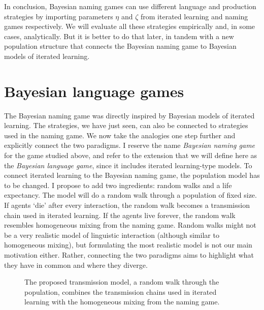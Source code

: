 \documentclass{../src/bcthesispart}
\begin{document}
In conclusion, Bayesian naming games can use different language and production strategies by importing parameters $\eta$ and $\zeta$ from iterated learning and naming games respectively.
We will evaluate all these strategies empirically and, in some cases, analytically.
But it is better to do that later, in tandem with a new population structure that connects the Bayesian naming game to Bayesian models of iterated learning.







\section{Bayesian language games}


The Bayesian naming game was directly inspired by Bayesian models of iterated learning.
The strategies, we have just seen, can also be connected to strategies used in the naming game.
We now take the analogies one step further and explicitly connect the two paradigms.
I reserve the name \emph{Bayesian naming game} for the game studied above, and refer to the extension that we will define here as the \emph{Bayesian language game}, since it includes iterated learning-type models.
To connect iterated learning to the Bayesian naming game, the population model has to be changed.
I propose to add two ingredients: random walks and a life expectancy.
The model will do a random walk through a population of fixed size. 
If agents ‘die’ after every interaction, the random walk becomes a transmission chain used in iterated learning.
If the agents live forever, the random walk resembles homogeneous mixing from the naming game.
Random walks might not be a very realistic model of linguistic interaction (although similar to homogeneous mixing), but formulating the most realistic model is not our main motivation either. 
Rather, connecting the two paradigms aims to highlight what they have in common and where they diverge.




\begin{SCfigure}\footnotesize
	
	
	\caption{%
	The proposed transmission model, a random walk through the population, combines the transmission chains used in iterated learning with the homogeneous mixing from the naming game.
	\label{fig:ch4:population-structures}}
\end{SCfigure}
\end{document}
